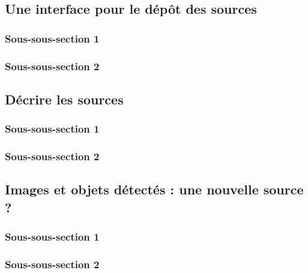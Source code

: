 
\subsection{Une interface pour le dépôt des sources}
    \subsubsection{Sous-sous-section 1}
    
    \subsubsection{Sous-sous-section 2}

    
\subsection{Décrire les sources}
        \subsubsection{Sous-sous-section 1}

        \subsubsection{Sous-sous-section 2}


\subsection{Images et objets détectés : une nouvelle source ?}
        \subsubsection{Sous-sous-section 1}


        \subsubsection{Sous-sous-section 2}

